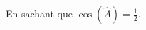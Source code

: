 
\begin{mental}
    En sachant que \( \cos(\hat A)=\frac{ 1 }{2}\).
\begin{center}
    
\end{center}

\end{mental}
